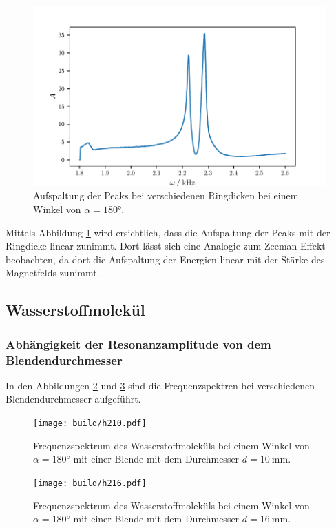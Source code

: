 \begin{figure}
    \centering
    \includegraphics{build/h3ring.pdf}
    \caption{Aufspaltung der Peaks bei verschiedenen Ringdicken bei einem Winkel von $\alpha = \ang{180}$.}
    \label{fig:h3ring}
\end{figure}
Mittels Abbildung \ref{fig:h3ring} wird ersichtlich, dass die Aufspaltung der Peaks mit der Ringdicke linear zunimmt.
Dort lässt sich eine Analogie zum Zeeman-Effekt beobachten, da dort die Aufspaltung der Energien linear mit der Stärke des Magnetfelds zunimmt.
\FloatBarrier

\subsection{Wasserstoffmolekül}
\subsubsection{Abhängigkeit der Resonanzamplitude von dem Blendendurchmesser}

In den Abbildungen \ref{fig:h210} und \ref{fig:h216} sind die Frequenzspektren bei verschiedenen Blendendurchmesser aufgeführt.
\begin{figure}
    \centering
    \texttt{[image: build/h210.pdf]}
    \caption{Frequenzspektrum des Wasserstoffmoleküls bei einem Winkel von $\alpha = \ang{180}$ mit einer Blende mit dem Durchmesser $d = \qty{10}{\milli\meter}$.}
    \label{fig:h210}
\end{figure}

\begin{figure}
    \centering
    \texttt{[image: build/h216.pdf]}
    \caption{Frequenzspektrum des Wasserstoffmoleküls bei einem Winkel von $\alpha = \ang{180}$ mit einer Blende mit dem Durchmesser $d = \qty{16}{\milli\meter}$.}
    \label{fig:h216}
\end{figure}

